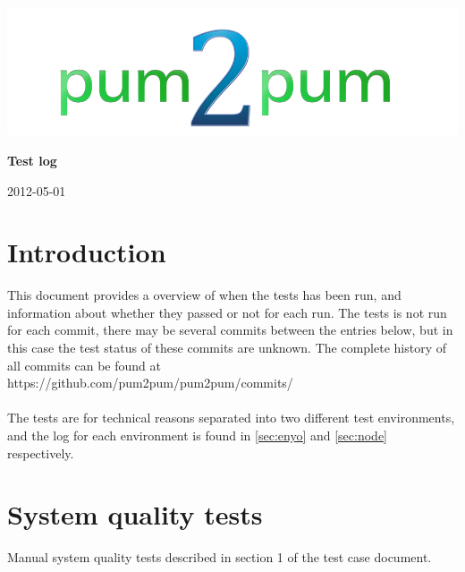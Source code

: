 \documentclass[a4paper, 12pt, titlepage]{article}
\begin{document}
	
	\begin{titlepage}
		
		\includegraphics[scale=0.4]{logoNormal.png}
		
		\vspace{6cm}
		
		\begin{center}
			\Huge{\textbf{Test log}} %
			
			\vspace{0.5cm}
			
			\huge{2012-05-01} %
		\end{center}
		
	\end{titlepage}
	
	\newpage


	\section{Introduction}
	This document provides a overview of when the tests has been run, and  information about whether they passed or not for each run. The tests is not run for each commit, there may be several commits between the entries below, but in this case the test status of these commits are unknown. The complete history of all commits can be found at\\

	https://github.com/pum2pum/pum2pum/commits/\\\\
	The tests are for technical reasons separated into two different test environments, and the log for each environment is found in \autoref{sec:enyo} and \autoref{sec:node} respectively.\\


	\section{System quality tests}
	\label{sec:quality}
	Manual system quality tests described in section 1 of the test case document.\\
\end{document}
